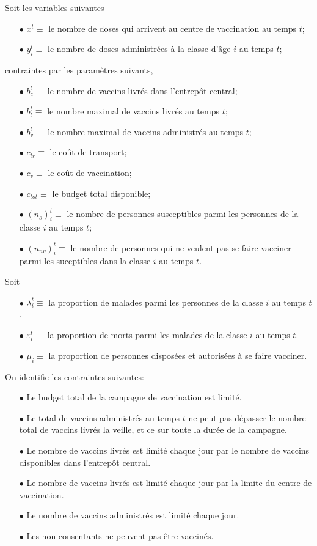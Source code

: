 \documentclass[a4paper,11pt]{report}
\begin{document}
Soit les variables suivantes
\begin{itemize}
\item[$\bullet$] $x^t \equiv$ le nombre de doses qui arrivent au centre de vaccination au temps $t$; 
\item[$\bullet$] $y_i^t \equiv$ le nombre de doses administrées à la classe d'âge $i$ au temps $t$;
\end{itemize}

contraintes par les paramètres suivants,

\begin{itemize}
\item[$\bullet$] $b_c^t \equiv$ le nombre de vaccins livrés dans l'entrepôt central;
\item[$\bullet$] $b_l^t \equiv$ le nombre maximal de vaccins livrés au temps $t$;
\item[$\bullet$] $b_v^t \equiv$ le nombre maximal de vaccins administrés au temps $t$;
\item[$\bullet$] $c_{tr} \equiv$ le coût de transport;
\item[$\bullet$] $c_v \equiv$ le coût de vaccination;
\item[$\bullet$] $c_{tot} \equiv$ le budget total disponible;
\item[$\bullet$] $(n_s)_i^t \equiv$ le nombre de personnes susceptibles parmi les personnes de la classe $i$ au temps $t$;
\item[$\bullet$] $(n_{nv})_i^t \equiv$ le nombre de personnes qui ne veulent pas se faire vacciner parmi les suceptibles dans la classe $i$ au temps $t$. 
\end{itemize}

Soit 
\begin{itemize}
\item[$\bullet$] $\lambda_i^t \equiv$ la proportion de malades parmi les personnes de la classe $i$ au temps $t$.
\item[$\bullet$] $\varepsilon_i^t \equiv$ la proportion de morts parmi les malades de la classe $i$ au temps $t$.
\item[$\bullet$] $\mu_i \equiv$ la proportion de personnes disposées et autorisées à se faire vacciner.
\end{itemize}


On identifie les contraintes suivantes:
\begin{itemize}
\item[$\bullet$] Le budget total de la campagne de vaccination est limité.
\item[$\bullet$] Le total de vaccins administrés au temps $t$ ne peut pas dépasser le nombre total de vaccins livrés la veille, et ce sur toute la durée de la campagne.
\item[$\bullet$] Le nombre de vaccins livrés est limité chaque jour par le nombre de vaccins disponibles dans l'entrepôt central.
\item[$\bullet$] Le nombre de vaccins livrés est limité chaque jour par la limite du centre de vaccination.
\item[$\bullet$] Le nombre de vaccins administrés est limité chaque jour.
\item[$\bullet$] Les non-consentants ne peuvent pas être vaccinés.
\end{itemize}
\end{document}
